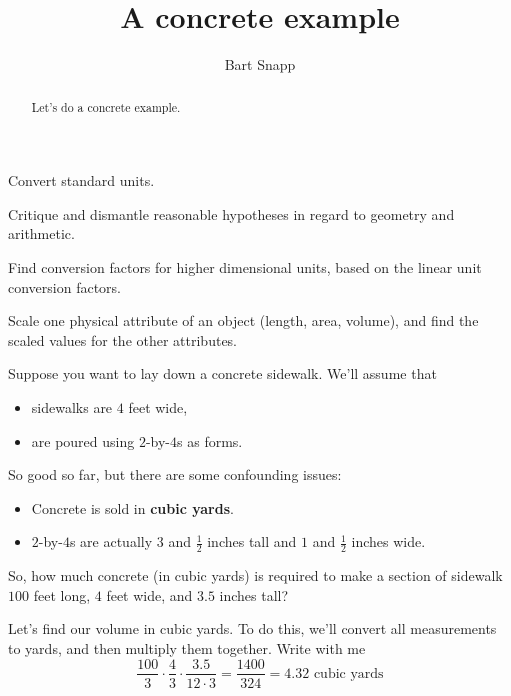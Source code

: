 \documentclass[handout,nooutcomes,noauthor]{ximera}
\title{A concrete example}
\author{Bart Snapp}
\begin{document}
\begin{abstract}
  Let's do a concrete example.
\end{abstract}
\maketitle


\begin{listOutcomes}
\item Convert standard units.
\item Critique and dismantle reasonable hypotheses in regard to
  geometry and arithmetic.
\item Find conversion factors for higher dimensional units, based on
  the linear unit conversion factors.
\item Scale one physical attribute of an object (length, area,
  volume), and find the scaled values for the other attributes.
\end{listOutcomes}



\mynewpage



\begin{question}
  Suppose you want to lay down a concrete sidewalk. We'll assume that
  \begin{itemize}
  \item sidewalks are $4$ feet wide,
  \item are poured using $2$-by-$4$s as forms.
  \end{itemize}
  So good so far, but there are some confounding issues:
  \begin{itemize}
  \item Concrete is sold in \textbf{cubic yards}.
  \item $2$-by-$4$s are actually $3$ and $\frac{1}{2}$ inches tall and
    $1$ and $\frac{1}{2}$ inches wide.
  \end{itemize}
  So, how much concrete (in cubic yards) is required to make a section
  of sidewalk $100$ feet long, $4$ feet wide, and $3.5$ inches tall?
  \begin{freeResponse}
    Let's find our volume in cubic yards. To do this, we'll convert
    all measurements to yards, and then multiply them together. Write with me
    \[
    \frac{100}{3} \cdot \frac{4}{3}\cdot \frac{3.5}{12\cdot 3} = \frac{1400}{324} = 4.32 \text{ cubic yards}
    \] 
  \end{freeResponse}
\end{question}
\mynewpage
\end{document}
